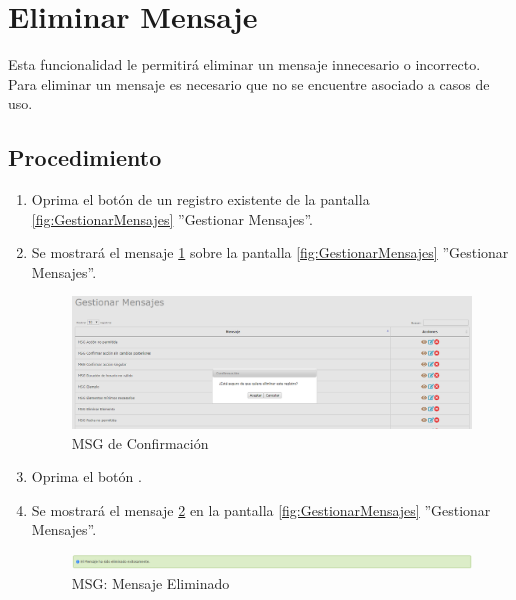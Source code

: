 \hypertarget{cv:eliminarMensaje}{\section{Eliminar Mensaje}} \label{sec:eliminarMensaje}

	Esta funcionalidad le permitirá eliminar un mensaje innecesario o incorrecto. Para eliminar un mensaje es necesario que no se encuentre asociado a casos de uso.

		\subsection{Procedimiento}

			\begin{enumerate}
	
			\item Oprima el botón \IUBotonEliminar{} de un registro existente de la pantalla \ref{fig:GestionarMensajes} ''Gestionar Mensajes''.
	
			\item Se mostrará el mensaje \ref{fig:confirmaEliminaMensaje} sobre la pantalla \ref{fig:GestionarMensajes} ''Gestionar Mensajes''.
			
			\begin{figure}[htbp!]
				\begin{center}
					\includegraphics[scale=0.40]{roles/lider/mensajes/pantallas/IU9-3MSG10}
					\caption{MSG de Confirmación}
					\label{fig:confirmaEliminaMensaje}
				\end{center}
			\end{figure}
						
			\item Oprima el botón \IUAceptar.
			
			\item Se mostrará el mensaje \ref{fig:mensajeEliminado} en la pantalla \ref{fig:GestionarMensajes} ''Gestionar Mensajes''.
			
			\begin{figure}[htbp!]
				\begin{center}
					\includegraphics[scale=0.40]{roles/lider/mensajes/pantallas/IU9-3MSG1}
					\caption{MSG: Mensaje Eliminado}
					\label{fig:mensajeEliminado}
				\end{center}
			\end{figure}
			\end{enumerate}
